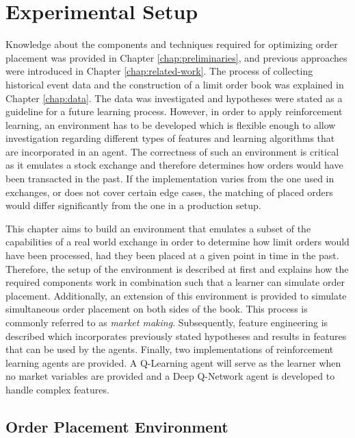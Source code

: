 \chapter{Experimental Setup}
\label{chap:setup}

Knowledge about the components and techniques required for optimizing order placement was provided in Chapter \ref{chap:preliminaries}, and previous approaches were introduced in Chapter \ref{chap:related-work}.
The process of collecting historical event data and the construction of a limit order book was explained in Chapter \ref{chap:data}.
The data was investigated and hypotheses were stated as a guideline for a future learning process.
However, in order to apply reinforcement learning, an environment has to be developed which is flexible enough to allow investigation regarding different types of features and learning algorithms that are incorporated in an agent.
The correctness of such an environment is critical as it emulates a stock exchange and therefore determines how orders would have been transacted in the past.
If the implementation varies from the one used in exchanges, or does not cover certain edge cases, the matching of placed orders would differ significantly from the one in a production setup.

This chapter aims to build an environment that emulates a subset of the capabilities of a real world exchange in order to determine how limit orders would have been processed, had they been placed at a given point in time in the past.
Therefore, the setup of the environment is described at first and explains how the required components work in combination such that a learner can simulate order placement.
Additionally, an extension of this environment is provided
to simulate simultaneous order placement on both sides of the book.
This process is commonly referred to as \textit{market making}.
Subsequently, feature engineering is described which incorporates previously stated hypotheses and results in features that can be used by the agents.
Finally, two implementations of reinforcement learning agents are provided.
A Q-Learning agent will serve as the learner when no market variables are provided and a Deep Q-Network agent is developed to handle complex features.


\section{Order Placement Environment}
\label{sec:setup-order-placement}

